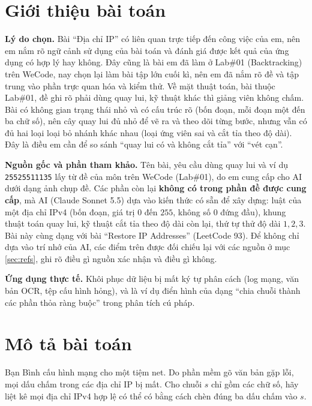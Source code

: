 \documentclass[12pt,a4paper]{article}
\begin{document}
\section{Giới thiệu bài toán}

\textbf{Lý do chọn.} Bài ``Địa chỉ IP'' có liên quan trực tiếp đến công việc của em, nên em nắm rõ ngữ cảnh sử dụng của bài toán và đánh giá được kết quả của ứng dụng có hợp lý hay không. Đây cũng là bài em đã làm ở Lab\#01 (Backtracking) trên WeCode, nay chọn lại làm bài tập lớn cuối kì, nên em đã nắm rõ đề và tập trung vào phần trực quan hóa và kiểm thử. Về mặt thuật toán, bài thuộc Lab\#01, đề ghi rõ phải dùng quay lui, kỹ thuật khác thì giảng viên không chấm. Bài có không gian trạng thái nhỏ và có cấu trúc rõ (bốn đoạn, mỗi đoạn một đến ba chữ số), nên cây quay lui đủ nhỏ để vẽ ra và theo dõi từng bước, nhưng vẫn có đủ hai loại loại bỏ nhánh khác nhau (loại ứng viên sai và cắt tỉa theo độ dài). Đây là điều em cần để so sánh ``quay lui có và không cắt tỉa'' với ``vét cạn''.

\textbf{Nguồn gốc và phần tham khảo.} Tên bài, yêu cầu dùng quay lui và ví dụ \texttt{25525511135} lấy từ đề của môn trên WeCode (Lab\#01), do em cung cấp cho AI dưới dạng ảnh chụp đề. Các phần còn lại \textbf{không có trong phần đề được cung cấp}, mà AI (Claude Sonnet 5.5) dựa vào kiến thức có sẵn để xây dựng: luật của một địa chỉ IPv4 (bốn đoạn, giá trị $0$ đến $255$, không số $0$ đứng đầu), khung thuật toán quay lui, kỹ thuật cắt tỉa theo độ dài còn lại, thứ tự thử độ dài $1,2,3$. Bài này cùng dạng với bài ``Restore IP Addresses'' (LeetCode 93). Để không chỉ dựa vào trí nhớ của AI, các điểm trên được đối chiếu lại với các nguồn ở mục \ref{sec:refs}, ghi rõ điều gì nguồn xác nhận và điều gì không.

\textbf{Ứng dụng thực tế.} Khôi phục dữ liệu bị mất ký tự phân cách (log mạng, văn bản OCR, tệp cấu hình hỏng), và là ví dụ điển hình của dạng ``chia chuỗi thành các phần thỏa ràng buộc'' trong phân tích cú pháp.

\section{Mô tả bài toán}

Bạn Bình cấu hình mạng cho một tiệm net. Do phần mềm gõ văn bản gặp lỗi, mọi dấu chấm trong các địa chỉ IP bị mất. Cho chuỗi $s$ chỉ gồm các chữ số, hãy liệt kê mọi địa chỉ IPv4 hợp lệ có thể có bằng cách chèn đúng ba dấu chấm vào $s$.
\end{document}
